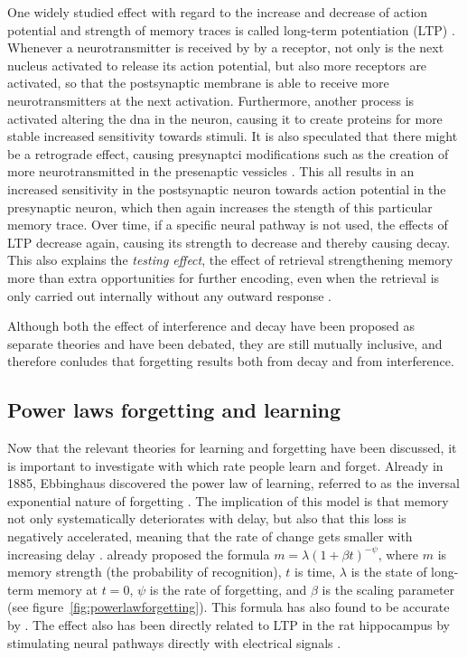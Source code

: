 One widely studied effect with regard to the increase and decrease of action potential and strength of memory traces is called long-term potentiation (LTP) \cite{cognitivepsychology}. Whenever a neurotransmitter is received by by a receptor, not only is the next nucleus activated to release its action potential, but also more receptors are activated, so that the postsynaptic membrane is able to receive more neurotransmitters at the next activation. Furthermore, another process is activated altering the dna in the neuron, causing it to create proteins for more stable increased sensitivity towards stimuli. It is also speculated that there might be a retrograde effect, causing presynaptci modifications such as the creation of more neurotransmitted in the presenaptic vessicles \cite{longtermpotentiation}. This all results in an increased sensitivity in the postsynaptic neuron towards action potential in the presynaptic neuron, which then again increases the stength of this particular memory trace. Over time, if a specific neural pathway is not used, the effects of LTP decrease again, causing its strength to decrease and thereby causing decay. This also explains the \emph{testing effect}, the effect of retrieval strengthening memory more than extra opportunities for further encoding, even when the retrieval is only carried out internally without any outward response \cite{microlearning}.

Although both the effect of interference and decay have been proposed as separate theories and have been debated, they are still mutually inclusive, and  therefore conludes that forgetting results both from decay and from interference.

\subsection{Power laws forgetting and learning}

Now that the relevant theories for learning and forgetting have been discussed, it is important to investigate with which rate people learn and forget. Already in 1885, Ebbinghaus discovered the power law of learning, referred to as the inversal exponential nature of forgetting \cite{microlearning, activationbasedmodel}. The implication of this model is that memory not only systematically deteriorates with delay, but also that this loss is negatively accelerated, meaning that the rate of change gets smaller with increasing delay \cite{cognitivepsychology}.  already proposed the formula $m = \lambda (1 + \beta t)^{-\psi}$, where $m$ is memory strength (the probability of recognition), $t$ is time, $\lambda$ is the state of long-term memory at $t = 0$, $\psi$ is the rate of forgetting, and $\beta$ is the scaling parameter (see figure~\ref{fig:powerlawforgetting}). This formula has also found to be accurate by \cite{wixted}. The effect also has been directly related to LTP in the rat hippocampus by stimulating neural pathways directly with electrical signals \cite{raymond}.

